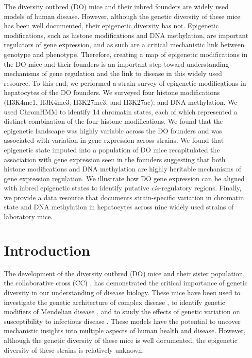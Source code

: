 \documentclass[
  11pt,
]{article}
\begin{document}
The diversity outbred (DO) mice and their inbred founders are widely
used models of human disease. However, although the genetic diversity of
these mice has been well documented, their epigenetic diversity has not.
Epigenetic modifications, such as histone modifications and DNA
methylation, are important regulators of gene expression, and as such
are a critical mechanistic link between genotype and phenotype.
Therefore, creating a map of epigenetic modifications in the DO mice and
their founders is an important step toward understanding mechanisms of
gene regulation and the link to disease in this widely used resource. To
this end, we performed a strain survey of epigenetic modifications in
hepatocytes of the DO founders. We surveyed four histone modifications
(H3K4me1, H3K4me3, H3K27me3, and H3K27ac), and DNA methylation. We used
ChromHMM to identify 14 chromatin states, each of which represented a
distinct combination of the four histone modifications. We found that
the epigenetic landscape was highly variable across the DO founders and
was associated with variation in gene expression across strains. We
found that epigenetic state imputed into a population of DO mice
recapitulated the association with gene expression seen in the founders
suggesting that both histone modifications and DNA methylation are
highly heritable mechanisms of gene expression regulation. We illustrate
how DO gene expression can be aligned with inbred epigenetic states to
identify putative \textit{cis}-regulatory regions. Finally, we provide a
data resource that documents strain-specific variation in chromatin
state and DNA methylation in hepatocytes across nine widely used strains
of laboratory mice.

\hypertarget{introduction}{%
\section{Introduction}\label{introduction}}

The development of the diversity outbred (DO) mice
\citep{Svenson:2012hq, churchill2012diversity, koyuncu2021cxcl1, kurtz2020diversity, bogue2015collaborative, kebede2014insights, keller2019gene}
and their sister population, the collaborative cross (CC)
\citep{threadgill2011collaborative, threadgill2012ten, durrant2011collaborative, mao2015identification, graham2021baseline},
has demonstrated the critical importance of genetic diversity in our
understanding of disease biology. These mice have been used to
investigate the genetic architecture of complex disease
\citep{pmid28592500}, to identify genetic modifiers of Mendelian disease
\citep{takemon2021uncovering}, and to study the effects of genetic
variation on susceptibility to infectious disease
\citep{kurtz2020diversity}. These models have the potential to uncover
mechanistic insights into multiple aspects of human health and disease.
However, although the genetic diversity of these mice is well
documented, the epigenetic diversity of these strains is relatively
unknown.
\end{document}
